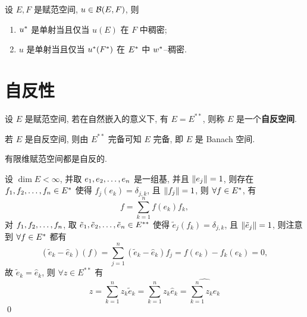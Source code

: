 	\begin{Corollary}
		设 $ E, F $ 是赋范空间, $u\in\mathcal{B}(E, F)$, 则
		\begin{enumerate}[(1)]
			\item $ u^{*} $ 是单射当且仅当 $ u(E) $ 在 $ F $ 中稠密;
			\item $ u $ 是单射当且仅当 $ u^{*}(F^{*}) $ 在 $ E^{*} $ 中 $ w^{*} $--稠密.
		\end{enumerate}	
	\end{Corollary}

\section{自反性}
	\begin{Definition}[自反空间]\label{def:自反空间}
		设 $ E $ 是赋范空间, 若在自然嵌入的意义下, 有 $ E=E^{**} $, 则称 $ E $ 是一个\textbf{自反空间}.
	\end{Definition}
	\begin{Remark}
		若 $ E $ 是自反空间, 则由 $ E^{**} $ 完备可知 $ E $ 完备, 即 $ E $ 是 Banach 空间.
	\end{Remark}
	
	\begin{Proposition}
		有限维赋范空间都是自反的.
	\end{Proposition}
	\begin{Proof}
		设 $ \dim E<\infty $, 并取 $ e_{1}, e_{2}, \dots, e_{n} $ 是一组基, 并且 $ \left\| e_{j} \right\|=1 $, 则存在 $ f_{1}, f_{2}, \dots, f_{n}\in E^{*} $ 使得 $ f_{j}(e_{k})=\delta_{j, k} $, 且 $ \left\| f_{j} \right\|=1 $, 则 $ \forall f\in E^{*} $, 有
		\[
			f=\sum_{k=1}^{n}f(e_{k})f_{k},
		\]
		对 $ f_{1}, f_{2}, \dots, f_{n} $, 取 $ \tilde{e}_{1}, \tilde{e}_{2}, \dots, \tilde{e}_{n}\in E^{**} $ 使得 $ \tilde{e}_{j}(f_{k})=\delta_{j, k} $, 且 $ \left\| \tilde{e}_{j} \right\|=1 $, 则注意到 $ \forall f\in E^{*} $ 都有
		\[
			(\tilde{e}_{k}-\hat{e}_{k})(f)=\sum_{j=1}^{n}(\tilde{e}_{k}-\hat{e}_{k})f_{j}=f(e_{k})-f_{k}(e_{k})=0,
		\] 
		故 $ \tilde{e}_{k}=\hat{e}_{k} $, 则 $ \forall z\in E^{**} $ 有
		\[
			z=\sum_{k=1}^{n}z_{k}\tilde{e}_{k}=\sum_{k=1}^{n}z_{k}\hat{e}_{k}=\widehat{\sum_{k=1}^{n}z_{k}e_{k}}
		\]
		\qed
	\end{Proof}

